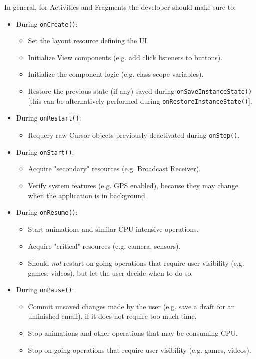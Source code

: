 \documentclass[11pt,a4paper,notitlepage]{article}
\begin{document}
In general, for Activities and Fragments the developer should make sure to:
\begin{itemize}
	\item During \texttt{onCreate()}:
	\begin{itemize}
		\item Set the layout resource defining the UI.
		\item Initialize View components (e.g. add click listeners to buttons).
		\item Initialize the component logic (e.g. class-scope variables).
		\item Restore the previous state (if any) saved during \texttt{onSaveInstanceState()} [this can be alternatively performed during \texttt{onRestoreInstanceState()}].
	\end{itemize}
	\item During \texttt{onRestart()}:
	\begin{itemize}
		\item Requery raw Cursor objects previously deactivated during \texttt{onStop()}.
	\end{itemize}
		\item During \texttt{onStart()}:
	\begin{itemize}
		\item Acquire "secondary" resources (e.g. Broadcast Receiver).
		\item Verify system features (e.g. GPS enabled), because they may change when the application is in background.
	\end{itemize}
	\item During \texttt{onResume()}:
	\begin{itemize}
		\item Start animations and similar CPU-intensive operations.
		\item Acquire "critical" resources (e.g. camera, sensors).
		\item Should \textit{not} restart on-going operations that require user visibility (e.g. games, videos), but let the user decide when to do so.
	\end{itemize}
	\item During \texttt{onPause()}:
	\begin{itemize}
		\item Commit unsaved changes made by the user (e.g. save a draft for an unfinished email), if it does not require too much time.
		\item Stop animations and other operations that may be consuming CPU.
		\item Stop on-going operations that require user visibility (e.g. games, videos).

\end{itemize}
\end{itemize}
\end{document}
